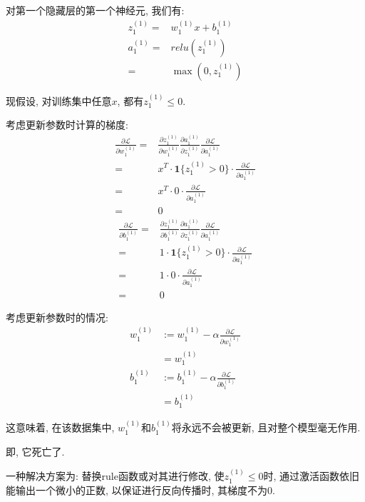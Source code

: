 \documentclass[]{subfiles}
\begin{document}
对第一个隐藏层的第一个神经元, 我们有:
\begin{align*}
z^{(1)}_1 = & w^{(1)}_1 x + b^{(1)}_1 \\
a^{(1)}_1 = & relu(z^{(1)}_1) \\
= & \max (0, z^{(1)}_1)
\end{align*}

现假设, 对训练集中任意$x$, 都有$z^{(1)}_1 \le 0$.

考虑更新参数时计算的梯度:
\begin{align*}
\frac{\partial \mathcal{L}}{\partial w^{(1)}_1}
= & \frac{\partial z^{(1)}_1}{\partial w^{(1)}_1}
    \frac{\partial a^{(1)}_1}{\partial z^{(1)}_1}
    \frac{\partial \mathcal{L}}{\partial a^{(1)}_1} \\
= & x^T \cdot \mathbf{1}\{z^{(1)}_1 > 0\} \cdot
    \frac{\partial \mathcal{L}}{\partial a^{(1)}_1} \\
= & x^T \cdot 0 \cdot
    \frac{\partial \mathcal{L}}{\partial a^{(1)}_1} \\
= & 0
\end{align*}
\begin{align*}
\frac{\partial \mathcal{L}}{\partial b^{(1)}_1}
= & \frac{\partial z^{(1)}_1}{\partial b^{(1)}_1}
    \frac{\partial a^{(1)}_1}{\partial z^{(1)}_1}
    \frac{\partial \mathcal{L}}{\partial a^{(1)}_1} \\
= & 1 \cdot \mathbf{1}\{z^{(1)}_1 > 0\} \cdot
    \frac{\partial \mathcal{L}}{\partial a^{(1)}_1} \\
= & 1 \cdot 0 \cdot
    \frac{\partial \mathcal{L}}{\partial a^{(1)}_1} \\
= & 0
\end{align*}

考虑更新参数时的情况:
\begin{align*}
w^{(1)}_1
& := w^{(1)}_1 - \alpha \frac{\partial \mathcal{L}}{\partial w^{(1)}_1} \\
& = w^{(1)}_1 \\
b^{(1)}_1
& := b^{(1)}_1 - \alpha \frac{\partial \mathcal{L}}{\partial b^{(1)}_1} \\
& = b^{(1)}_1
\end{align*}

这意味着, 在该数据集中, $w^{(1)}_1$和$b^{(1)}_1$将永远不会被更新, 且对整个模型毫无作用.

即, 它死亡了.

一种解决方案为:
替换rule函数或对其进行修改, 使$z^{(1)}_1 \le 0$时,
通过激活函数依旧能输出一个微小的正数, 以保证进行反向传播时,
其梯度不为0.
\end{document}
